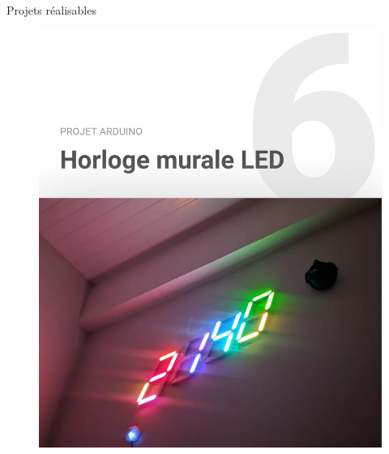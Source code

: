 \documentclass[]{beamer}
\begin{document}
	\begin{frame}
	{Projets réalisables}
			\begin{figure}
				\begin{center}
					\includegraphics[scale=0.4]{horloge.png}
				\end{center}
			\end{figure}
	\end{frame}
\end{document}
